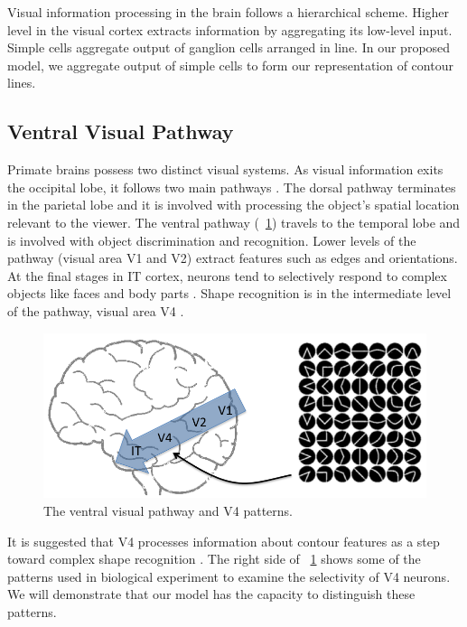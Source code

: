 \documentclass[10pt,letterpaper]{article}
\begin{document}
Visual information processing in the brain follows a hierarchical scheme.
Higher level in the visual cortex extracts information by aggregating its low-level input.
Simple cells aggregate output of ganglion cells arranged in line.
In our proposed model, we aggregate output of simple cells to form our representation of contour lines.

\subsection{Ventral Visual Pathway}

Primate brains possess two distinct visual systems. 
As visual information exits the occipital lobe, it follows two main pathways \cite{ettlinger1990}.
The dorsal pathway terminates in the parietal lobe 
and it is involved with processing the object's spatial location relevant to the viewer. 
The ventral pathway (\figurename~\ref{fig:2})
travels to the temporal lobe and is involved with object discrimination and recognition. 
Lower levels of the pathway (visual area V1 and V2) extract features such as edges and orientations. 
At the final stages in IT cortex, neurons tend to selectively respond to complex objects 
like faces and body parts \cite{bell2009}.
Shape recognition is in the intermediate level of the pathway, visual area V4 \cite{pasupathy2002}.

\begin{figure}[ht]
\begin{center}
\includegraphics[width=0.95\linewidth]{images/fig2.png}
\end{center}
\caption{The ventral visual pathway and V4 patterns.} 
\label{fig:2}
\end{figure}

It is suggested that V4 processes information about contour features 
as a step toward complex shape recognition \cite{pasupathy1999}.
The right side of \figurename~\ref{fig:2} shows some of the patterns 
used in biological experiment to examine the selectivity of V4 neurons.
We will demonstrate that our model has the capacity to distinguish these patterns.
\end{document}
